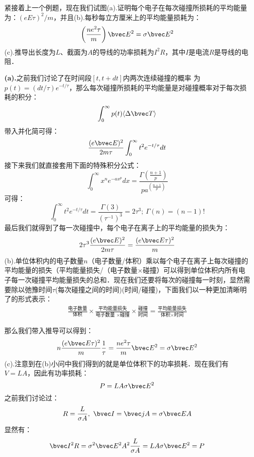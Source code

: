 \begin{exercise}{}
紧接着上一个例题，现在我们试图(a).证明每个电子在每次碰撞所损耗的平均能量为：$(eE\tau)^2/m$，并且(b).每秒每立方厘米上的平均能量损耗为：
\begin{equation}
\left(\frac{ne^2\tau}{m}\right)\bvec E^2=\sigma \bvec E^2
\end{equation}
(c).推导出长度为$L$、截面为$A$的导线的功率损耗为$I^2R$，其中$I$是电流$R$是导线的电阻．

\textbf{(a).}之前我们讨论了在时间段$[t, t + dt]$内两次连续碰撞的概率
为$p(t)=(dt/\tau)e^{- t/\tau}$，那么每次碰撞所损耗的平均能量是对碰撞概率对于每次损耗的积分：
\begin{equation}
\int_0^\infty p(t) \langle\Delta\bvec T\rangle
\end{equation}
带入并化简可得：
\begin{equation}
\frac{(e\bvec E)^2}{2m\tau}\int_0^\infty t^2 e^{- t/\tau}dt
\end{equation}
接下来我们就直接套用下面的特殊积分公式：
\begin{equation}
\int_0^\infty x^n e^{-ax^p}dx = \frac{\Gamma\left(\frac{n+1}{p}\right)}{pa^{\left(\frac{n+1}{p}\right)}}
\end{equation}
可得：
\begin{equation}
\int_0^\infty t^2 e^{- t/\tau}dt=\frac{\Gamma(3)}{(\tau^{-1})^3}=2\tau^3;\ \Gamma(n)=(n-1)!
\end{equation}
最后我们就得到了每一次碰撞中，每个电子在离子上的平均能量的损失为：
\begin{equation}
2\tau^3\frac{(e\bvec E)^2}{2m\tau}=\frac{(e\bvec E\tau)^2}{m}
\end{equation}
(b).单位体积内的电子数量$n$（电子数量/体积）乘以每个电子在离子上每次碰撞的平均能量的损失（平均能量损失/（电子数量$\times$碰撞）可以得到单位体积内所有电子每一次碰撞平均能量损失的总和．现在我们还要将每次的碰撞每一时刻，显然需要除以弛豫时间$\tau$(每次碰撞之间的时间)(时间/碰撞)，下面我们以一种更加清晰明了的形式表示：
\begin{align}
\frac{\mbox{电子数量}}{\mbox{体积}}\times \frac{\mbox{平均能量损失}}{\mbox{电子数量 }\times \mbox{碰撞}}\times\frac{\mbox{碰撞}}{\mbox{时间}}=\frac{\mbox{平均能量损失}}{\mbox{体积}\times \mbox{时间}}
\end{align}

那么我们带入推导可以得到：
\begin{equation}
n \frac{(e\bvec E\tau)^2}{m} \frac{1}{\tau} = \frac{ne^2\tau}{m}\bvec E^2 = \sigma \bvec E^2
\end{equation}
(c).注意到在(b)小问中我们得到的就是单位体积下的功率损耗．现在我们有$V=LA$，因此有功率损耗：
\begin{equation}
P = LA\sigma \bvec E^2
\end{equation}
之前我们讨论过：
\begin{equation}
R = \frac{L}{\sigma A},\ \bvec I = \bvec j A=\sigma\bvec E A
\end{equation}
显然有：
\begin{equation}
\bvec I^2 R=\sigma^2\bvec E^2 A^2 \frac{L}{\sigma A} = LA\sigma \bvec E^2 = P
\end{equation}
\end{exercise}




